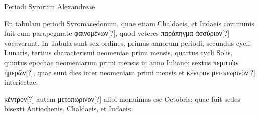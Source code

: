 \begin{table}[htbp]
 
 \caption{Periodi Syrorum Alexandreae}
 \label{tab:periodi_syrorum}
\end{table}
%
En tabulam periodi Syromacedonum, quae etiam Chaldaeis, et
Iudaeis communis fuit cum parapegmate \textgreek{φαινομένων[?]}, quod veteres
\textgreek{παράπηγμα ἀσσύριον[?]} vocaverunt.
In Tabula sunt sex ordines, primus
annorum periodi, secundus cycli Lunaris, tertius characterismi neomeniae
primi mensis, quartus cycli Solis, quintus epochae neomeniarum
primi mensis in anno Iuliano; sextus \textgreek{περιττῶν ἡμερῶν[?]}, quae sunt
dies inter neomeniam primi mensis et
 \textgreek{κέντρον μετοπωρινὸν[?]} interiectae.

\textgreek{κέντρον[?]} autem \textgreek{μετοπωρινὸν[?]}
 alibi monuimus ese  Octobris: quae fuit
sedes bisexti Antiochenis, Chaldaeis, et Iudaeis.

